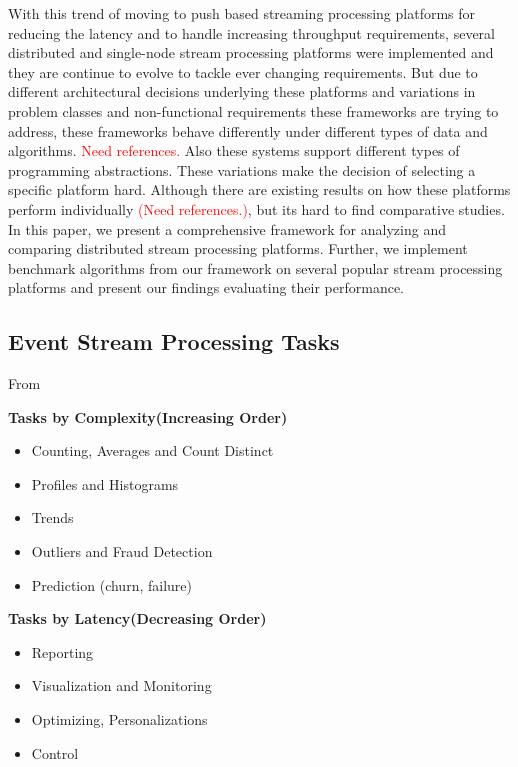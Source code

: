 \documentclass{sig-alternate}
\begin{document}
With this trend of moving to push based streaming processing platforms
for reducing the latency and to handle increasing throughput
requirements, several distributed and single-node stream processing
platforms were implemented and they are continue to evolve to tackle
ever changing requirements. But due to different architectural
decisions underlying these platforms and variations in problem classes and
non-functional requirements these frameworks are trying to address,
these frameworks behave differently under different types of data and
algorithms. \textcolor{Red}{Need references.} Also these systems
support different types of programming abstractions. These variations
make the decision of selecting a specific platform hard. Although
there are existing results on how these platforms perform
individually \textcolor{Red}{(Need references.)}, but its hard to find
comparative studies. In this paper, we present a comprehensive
framework for analyzing and comparing distributed stream processing
platforms. Further, we implement benchmark algorithms from our
 framework on several popular stream processing platforms and present
 our findings evaluating their performance.



 \subsection{Event Stream Processing Tasks}


From~\cite{streamdrill:presentation}

 \textbf{Tasks by Complexity(Increasing Order)}

 \begin{itemize}
  \item Counting, Averages and Count Distinct
  \item Profiles and Histograms
  \item Trends
  \item Outliers and Fraud Detection
  \item Prediction (churn, failure)
 \end{itemize}

\textbf{Tasks by Latency(Decreasing Order)}
\begin{itemize}
 \item Reporting
 \item Visualization and Monitoring
 \item Optimizing, Personalizations
 \item Control
\end{itemize}
\end{document}
